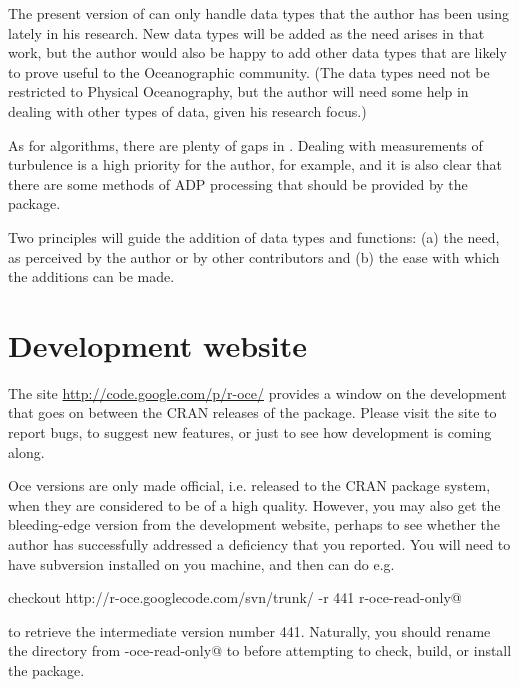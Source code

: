 \documentclass{article}
\begin{document}
The present version of \verb@oce@ can only handle data types that the author has
been using lately in his research. New data types will be added as the need
arises in that work, but the author would also be happy to add other data types
that are likely to prove useful to the Oceanographic community.  (The data types
need not be restricted to Physical Oceanography, but the author will need some
help in dealing with other types of data, given his research focus.)

As for algorithms, there are plenty of gaps in \verb@oce@.  Dealing with
measurements of turbulence is a high priority for the author, for example, and
it is also clear that there are some methods of ADP processing that should be
provided by the package.

Two principles will guide the addition of data types and functions:
(a) the need, as perceived by the author or by other contributors and
(b) the ease with which the additions can be made.

\section{Development website}

The site \url{http://code.google.com/p/r-oce/} provides a window on the
development that goes on between the CRAN releases of the package. Please visit
the site to report bugs, to suggest new features, or just to see how \verb@oce@
development is coming along.

Oce versions are only made official, i.e. released to the CRAN package system,
when they are considered to be of a high quality.  However, you may also get the
bleeding-edge version from the development website, perhaps to see whether the
author has successfully addressed a deficiency that you reported.  You will need
to have subversion installed on you machine, and then can do e.g.

\verb@svn checkout http://r-oce.googlecode.com/svn/trunk/ -r 441 r-oce-read-only@

\noindent to retrieve the intermediate version number 441. Naturally, you should
rename the directory from \verb@r-oce-read-only@ to \verb@oce@ before attempting
to check, build, or install the package.

%
%
%
%
%
\end{document}

